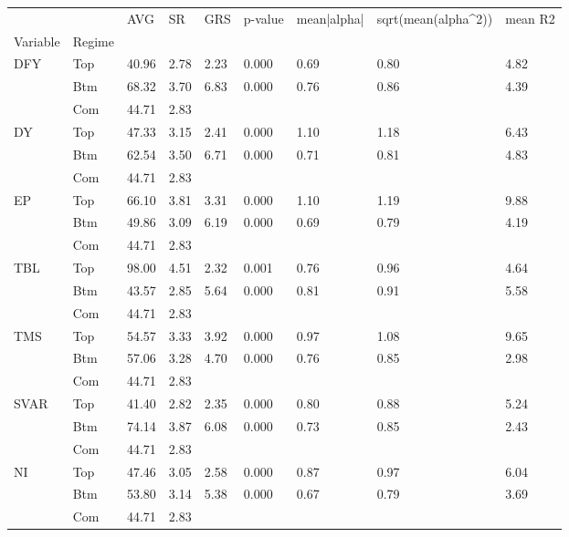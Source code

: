 \begin{tabular}{lllllllll}
\toprule
   &     &    AVG &    SR &   GRS & p-value & mean|alpha| & sqrt(mean(alpha\textasciicircum 2)) & mean R2 \\
Variable & Regime &        &       &       &         &             &                     &         \\
\midrule
DFY & Top &  40.96 &  2.78 &  2.23 &   0.000 &        0.69 &                0.80 &    4.82 \\
   & Btm &  68.32 &  3.70 &  6.83 &   0.000 &        0.76 &                0.86 &    4.39 \\
   & Com &  44.71 &  2.83 &       &         &             &                     &         \\
DY & Top &  47.33 &  3.15 &  2.41 &   0.000 &        1.10 &                1.18 &    6.43 \\
   & Btm &  62.54 &  3.50 &  6.71 &   0.000 &        0.71 &                0.81 &    4.83 \\
   & Com &  44.71 &  2.83 &       &         &             &                     &         \\
EP & Top &  66.10 &  3.81 &  3.31 &   0.000 &        1.10 &                1.19 &    9.88 \\
   & Btm &  49.86 &  3.09 &  6.19 &   0.000 &        0.69 &                0.79 &    4.19 \\
   & Com &  44.71 &  2.83 &       &         &             &                     &         \\
TBL & Top &  98.00 &  4.51 &  2.32 &   0.001 &        0.76 &                0.96 &    4.64 \\
   & Btm &  43.57 &  2.85 &  5.64 &   0.000 &        0.81 &                0.91 &    5.58 \\
   & Com &  44.71 &  2.83 &       &         &             &                     &         \\
TMS & Top &  54.57 &  3.33 &  3.92 &   0.000 &        0.97 &                1.08 &    9.65 \\
   & Btm &  57.06 &  3.28 &  4.70 &   0.000 &        0.76 &                0.85 &    2.98 \\
   & Com &  44.71 &  2.83 &       &         &             &                     &         \\
SVAR & Top &  41.40 &  2.82 &  2.35 &   0.000 &        0.80 &                0.88 &    5.24 \\
   & Btm &  74.14 &  3.87 &  6.08 &   0.000 &        0.73 &                0.85 &    2.43 \\
   & Com &  44.71 &  2.83 &       &         &             &                     &         \\
NI & Top &  47.46 &  3.05 &  2.58 &   0.000 &        0.87 &                0.97 &    6.04 \\
   & Btm &  53.80 &  3.14 &  5.38 &   0.000 &        0.67 &                0.79 &    3.69 \\
   & Com &  44.71 &  2.83 &       &         &             &                     &         \\
\bottomrule
\end{tabular}
